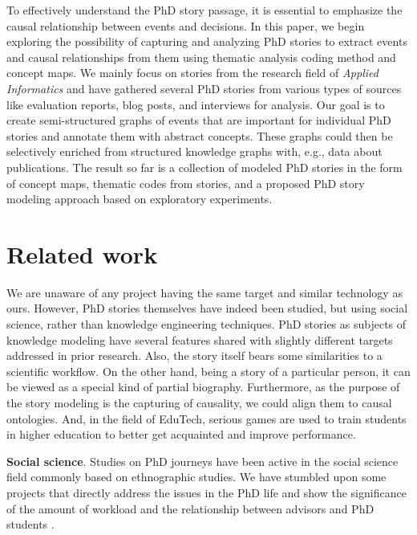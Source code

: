 \documentclass[sigconf]{acmart}
\begin{document}
To effectively understand the PhD story passage, it is essential to emphasize the causal relationship between events and decisions. In this paper, we begin exploring the possibility of capturing and analyzing PhD stories to extract events and causal relationships from them using thematic analysis coding method \cite{thematic_analysis} and concept maps. %
We mainly focus on stories from the research field of \textit{Applied Informatics} and have gathered several PhD stories from various types of sources like evaluation reports, %
blog posts, and interviews %
for analysis. Our goal is to create semi-structured graphs of events that are important for individual PhD stories and annotate them with abstract concepts. These graphs could then be selectively enriched from structured knowledge graphs with, e.g., data about publications. The result so far is a collection of modeled PhD stories in the form of concept maps, thematic codes from stories, and a proposed PhD story modeling approach based on exploratory experiments. %

\section{Related work}
\label{section:related-work}
We are unaware of any project having the same target and similar technology as ours. 
However, PhD stories themselves have indeed been studied, but using social science, rather than knowledge engineering techniques.
PhD stories as subjects of knowledge modeling have several features shared with slightly different targets addressed in prior research. 
Also, the story itself bears some similarities to a scientific workflow. 
On the other hand, being a story of a particular person, it can be viewed as a special kind of partial biography. 
Furthermore, as the purpose of the story modeling is the capturing of causality, we could align them to causal ontologies. 
And, in the field of EduTech, serious games are used to train students in higher education to better get acquainted and improve performance.

\medskip
\noindent \textbf{Social science}.
Studies on PhD journeys have been active in the social science field commonly based on ethnographic studies. %
We have stumbled upon some projects that directly address the issues in the PhD life and show the significance of the amount of workload and the relationship between advisors and PhD students \cite{doi:10.1080/0158037X.2019.1652158}.%
\end{document}
